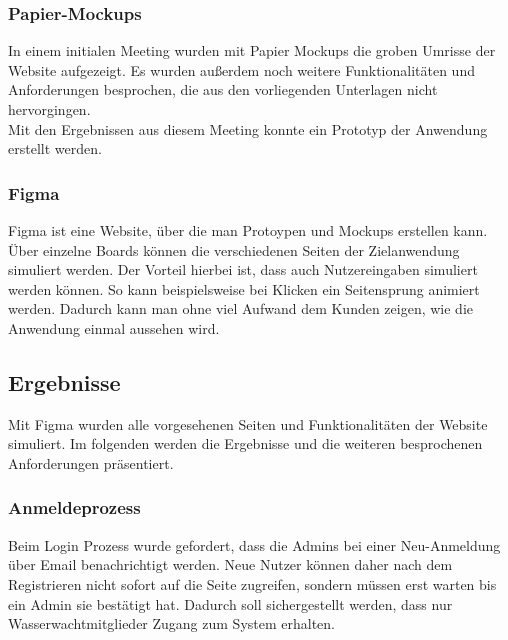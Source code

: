 \documentclass[fontsize=12pt,openright,oneside,paper=a4,BCOR=1cm]{scrbook}
\begin{document}
\subsubsection{Papier-Mockups}
In einem initialen Meeting wurden mit Papier Mockups die groben Umrisse der Website aufgezeigt. Es wurden außerdem noch weitere Funktionalitäten und Anforderungen besprochen, die aus den vorliegenden Unterlagen nicht hervorgingen. \\
Mit den Ergebnissen aus diesem Meeting konnte ein Prototyp der Anwendung erstellt werden.


\subsubsection{Figma}
Figma ist eine Website, über die man Protoypen und Mockups erstellen kann. Über einzelne Boards können die verschiedenen Seiten der Zielanwendung simuliert werden. Der Vorteil hierbei ist, dass auch Nutzereingaben simuliert werden können. So kann beispielsweise bei Klicken ein Seitensprung animiert werden. Dadurch kann man ohne viel Aufwand dem Kunden zeigen, wie die Anwendung einmal aussehen wird. 

\subsection{Ergebnisse}
Mit Figma wurden alle vorgesehenen Seiten und Funktionalitäten der Website simuliert. Im folgenden werden die Ergebnisse und die weiteren besprochenen Anforderungen präsentiert. \\

\subsubsection{Anmeldeprozess}

Beim Login Prozess wurde gefordert, dass die \glqq Admins\grqq{} bei einer Neu-Anmeldung über Email benachrichtigt werden. Neue Nutzer können daher nach dem Registrieren nicht sofort auf die Seite zugreifen, sondern müssen erst warten bis ein Admin sie bestätigt hat. Dadurch soll sichergestellt werden, dass nur Wasserwachtmitglieder Zugang zum System erhalten.\\
\end{document}

